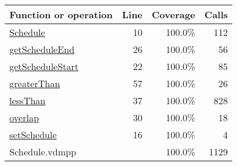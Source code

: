 \bigskip
\begin{longtable}{|l|r|r|r|}
\hline
Function or operation & Line & Coverage & Calls \\
\hline
\hline
\hyperref[Schedule:10]{Schedule} & 10&100.0\% & 112 \\
\hline
\hyperref[getScheduleEnd:26]{getScheduleEnd} & 26&100.0\% & 56 \\
\hline
\hyperref[getScheduleStart:22]{getScheduleStart} & 22&100.0\% & 85 \\
\hline
\hyperref[greaterThan:57]{greaterThan} & 57&100.0\% & 26 \\
\hline
\hyperref[lessThan:37]{lessThan} & 37&100.0\% & 828 \\
\hline
\hyperref[overlap:30]{overlap} & 30&100.0\% & 18 \\
\hline
\hyperref[setSchedule:16]{setSchedule} & 16&100.0\% & 4 \\
\hline
\hline
Schedule.vdmpp & & 100.0\% & 1129 \\
\hline
\end{longtable}

